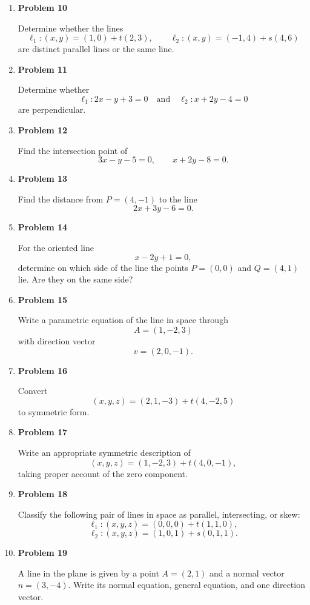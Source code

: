 \begin{enumerate}
\item \textbf{Problem 10}\par
Determine whether the lines
\[
\ell_1:(x,y)=(1,0)+t(2,3),
\qquad
\ell_2:(x,y)=(-1,4)+s(4,6)
\]
are distinct parallel lines or the same line.

\item \textbf{Problem 11}\par
Determine whether
\[
\ell_1:2x-y+3=0
\quad\text{and}\quad
\ell_2:x+2y-4=0
\]
are perpendicular.

\item \textbf{Problem 12}\par
Find the intersection point of
\[
3x-y-5=0,
\qquad
x+2y-8=0.
\]

\item \textbf{Problem 13}\par
Find the distance from \(P=(4,-1)\) to the line
\[
2x+3y-6=0.
\]

\item \textbf{Problem 14}\par
For the oriented line
\[
x-2y+1=0,
\]
determine on which side of the line the points \(P=(0,0)\) and \(Q=(4,1)\) lie. Are they on the same side?

\item \textbf{Problem 15}\par
Write a parametric equation of the line in space through
\[
A=(1,-2,3)
\]
with direction vector
\[
v=(2,0,-1).
\]

\item \textbf{Problem 16}\par
Convert
\[
(x,y,z)=(2,1,-3)+t(4,-2,5)
\]
to symmetric form.

\item \textbf{Problem 17}\par
Write an appropriate symmetric description of
\[
(x,y,z)=(1,-2,3)+t(4,0,-1),
\]
taking proper account of the zero component.

\item \textbf{Problem 18}\par
Classify the following pair of lines in space as parallel, intersecting, or skew:
\[
\ell_1:(x,y,z)=(0,0,0)+t(1,1,0),
\]
\[
\ell_2:(x,y,z)=(1,0,1)+s(0,1,1).
\]

\item \textbf{Problem 19}\par
A line in the plane is given by a point \(A=(2,1)\) and a normal vector \(n=(3,-4)\). Write its normal equation, general equation, and one direction vector.


\end{enumerate}
